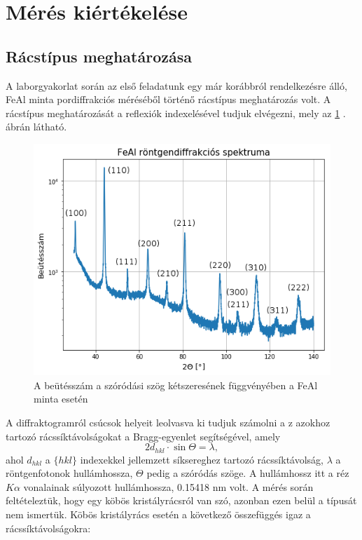 \documentclass[12pt,a4paper]{article}
\begin{document}
\section{Mérés kiértékelése}
\subsection{Rácstípus meghatározása}
\hspace*{10pt} A laborgyakorlat során az első feladatunk egy már korábbról rendelkezésre álló, FeAl minta pordiffrakciós méréséből történő rácstípus meghatározás volt. A rácstípus meghatározását a reflexiók indexelésével tudjuk elvégezni, mely az \ref{fig:1} . ábrán látható.\\
\begin{figure}[!h]
\centering
\includegraphics[scale=0.75]{FeAl_ind}
\caption{A beütésszám a szóródási szög kétszeresének függvényében a FeAl minta esetén}
\label{fig:1}
\end{figure}
\newpage
A diffraktogramról csúcsok helyeit leolvasva ki tudjuk számolni a z azokhoz tartozó rácssíktávolságokat a Bragg-egyenlet segítségével, amely
$$ 2d_{hkl} \cdot \sin \Theta = \lambda ,$$
ahol $d_{hkl}$ a $\{hkl\}$ indexekkel jellemzett síksereghez tartozó rácssíktávolság, $\lambda$ a röntgenfotonok hullámhossza, $\Theta$ pedig a szóródás szöge. A hullámhossz itt a réz $K\alpha$ vonalainak súlyozott hullámhossza, 0.15418 nm volt. A mérés során feltételeztük, hogy egy köbös kristályrácsról van szó, azonban ezen belül a típusát nem ismertük. Köbös kristályrács esetén a következő összefüggés igaz a rácssíktávolságokra:
\end{document}
